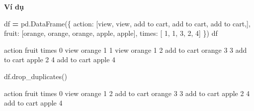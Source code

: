 \documentclass[
]{book}
\newenvironment{Shaded}{\begin{snugshade}}{\end{snugshade}}
\newcommand{\DecValTok}[1]{\textcolor[rgb]{0.00,0.00,0.81}{#1}}
\newcommand{\NormalTok}[1]{#1}
\newcommand{\OperatorTok}[1]{\textcolor[rgb]{0.81,0.36,0.00}{\textbf{#1}}}
\newcommand{\StringTok}[1]{\textcolor[rgb]{0.31,0.60,0.02}{#1}}
\begin{document}
\textbf{Ví dụ}

\begin{Shaded}
\begin{Highlighting}[]
\NormalTok{df }\OperatorTok{=}\NormalTok{ pd.DataFrame(\{}
    \StringTok{\textquotesingle{}action\textquotesingle{}}\NormalTok{: [}\StringTok{\textquotesingle{}view\textquotesingle{}}\NormalTok{, }\StringTok{\textquotesingle{}view\textquotesingle{}}\NormalTok{, }\StringTok{\textquotesingle{}add to cart\textquotesingle{}}\NormalTok{, }\StringTok{\textquotesingle{}add to cart\textquotesingle{}}\NormalTok{, }\StringTok{\textquotesingle{}add to cart\textquotesingle{}}\NormalTok{,],}
    \StringTok{\textquotesingle{}fruit\textquotesingle{}}\NormalTok{: [}\StringTok{\textquotesingle{}orange\textquotesingle{}}\NormalTok{, }\StringTok{\textquotesingle{}orange\textquotesingle{}}\NormalTok{, }\StringTok{\textquotesingle{}orange\textquotesingle{}}\NormalTok{, }\StringTok{\textquotesingle{}apple\textquotesingle{}}\NormalTok{, }\StringTok{\textquotesingle{}apple\textquotesingle{}}\NormalTok{],}
    \StringTok{\textquotesingle{}times\textquotesingle{}}\NormalTok{:   [ }\DecValTok{1}\NormalTok{, }\DecValTok{1}\NormalTok{, }\DecValTok{3}\NormalTok{, }\DecValTok{2}\NormalTok{, }\DecValTok{4}\NormalTok{]}
\NormalTok{\})}
\NormalTok{df}
\end{Highlighting}
\end{Shaded}

\begin{Shaded}
\begin{Highlighting}[]
\NormalTok{        action  fruit   times}
\NormalTok{0         view  orange      1}
\NormalTok{1         view  orange      1}
\NormalTok{2  add to cart  orange      3}
\NormalTok{3  add to cart   apple      2}
\NormalTok{4  add to cart   apple      4}
\end{Highlighting}
\end{Shaded}

\begin{Shaded}
\begin{Highlighting}[]
\NormalTok{df.drop\_duplicates()}
\end{Highlighting}
\end{Shaded}

\begin{Shaded}
\begin{Highlighting}[]
\NormalTok{        action  fruit   times}
\NormalTok{0         view  orange      1}
\NormalTok{2  add to cart  orange      3}
\NormalTok{3  add to cart   apple      2}
\NormalTok{4  add to cart   apple      4}
\end{Highlighting}
\end{Shaded}
\end{document}
